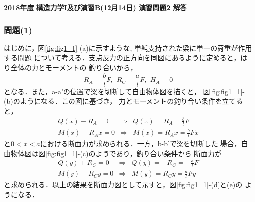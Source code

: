 \documentclass[10pt,a4j]{jarticle}
\newlength{\minitwocolumn}
\begin{document}
\newcommand{\fat}[1]{\mbox{\boldmath $#1$}}
\newcommand{\D}{\partial}
\newcommand{\w}{\omega}
\newcommand{\ga}{\alpha}
\newcommand{\gb}{\beta}
\newcommand{\gx}{\xi}
\newcommand{\gz}{\zeta}
\newcommand{\vhat}[1]{\hat{\fat{#1}}}
\newcommand{\spc}{\vspace{0.7\baselineskip}}
\newcommand{\halfspc}{\vspace{0.3\baselineskip}}

\pagestyle{empty}
\newcommand{\twofig}[2]
 {
   \begin{figure}[h]
     \begin{minipage}[t]{\minitwocolumn}
         \begin{center}   #1
         \end{center}
     \end{minipage}
         \hspace{\columnsep}
     \begin{minipage}[t]{\minitwocolumn}
         \begin{center} #2
         \end{center}
     \end{minipage}
   \end{figure}
 }
\begin{center}
{\Large \bf 2018年度 構造力学I及び演習B(12月14日) 演習問題2 解答} \\
\end{center}
\subsubsection*{問題(1)}
はじめに，図\ref{fig:fig1_1}-(a)に示すような, 単純支持された梁に単一の荷重が作用する問題
について考える．支点反力の正方向を同図にあるように定めると，はり全体の力とモーメントの
釣り合いから，
\begin{equation}
	R_A=\frac{b}{l}F, \ \ 
	R_C=\frac{a}{l}F, \ \ 
	H_A=0 
	\label{eqn:Rs_simple}
\end{equation}
となる．また，a-a'の位置で梁を切断して自由物体図を描くと，
図\ref{fig:fig1_1}-(b)のようになる．この図に基づき，
力とモーメントの釣り合い条件を立てると，
\begin{eqnarray}
	Q(x)-R_A=0  &\Rightarrow & Q(x)= R_A=\frac{b}{l}F
	\label{eqn:Qx}
	\\
	M(x)-R_Ax=0  &\Rightarrow & M(x)= R_Ax=\frac{b}{l}Fx
	\label{eqn:Mx}
\end{eqnarray}
と$0<x<a $における断面力が求められる．一方，b-b'で梁を切断した
場合，自由物体図は図\ref{fig:fig1_1}-(c)のようであり，釣り合い条件から
断面力が
\begin{eqnarray}
	Q(y)+R_C=0  &\Rightarrow & Q(y)= -R_C=-\frac{a}{l}F
	\label{eqn:Qy}
	\\
	M(y)-R_Cy=0  &\Rightarrow & M(y)= R_Cy=\frac{a}{l}Fy
	\label{eqn:My}
\end{eqnarray}
と求められる．以上の結果を断面力図として示すと，図\ref{fig:fig1_1}-(d)と(e)の
ようになる．
\end{document}

